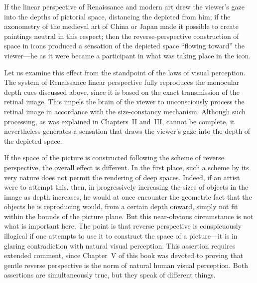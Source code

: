 If the linear perspective of Renaissance and modern art drew the viewer's gaze into
the depths of pictorial space, distancing the depicted from him; if the axonometry
of the medieval art of China or Japan made it possible to create paintings neutral
in this respect; then the reverse-perspective construction of space in icons produced
a sensation of the depicted space ``flowing toward'' the viewer---he as it were
became a participant in what was taking place in the icon.


Let us examine this effect from the standpoint of the laws of visual perception.
The system of Renaissance linear perspective fully reproduces the monocular depth
cues discussed above, since it is based on the exact transmission of the retinal
image. This impels the brain of the viewer to unconsciously process the retinal
image in accordance with the size-constancy mechanism. Although such processing,
as was explained in Chapters~II and~III, cannot be complete, it nevertheless
generates a sensation that draws the viewer's gaze into the depth of the depicted
space.

If the space of the picture is constructed following the scheme of reverse
perspective, the overall effect is different. In the first place, such a scheme by
its very nature does not permit the rendering of deep spaces. Indeed, if an artist
were to attempt this, then, in progressively increasing the sizes of objects in the
image as depth increases, he would at once encounter the geometric fact that the
objects he is reproducing would, from a certain depth onward, simply not fit within
the bounds of the picture plane. But this near-obvious circumstance is not what is
important here. The point is that reverse perspective is conspicuously illogical if
one attempts to use it to construct the space of a picture---it is in glaring
contradiction with natural visual perception. This assertion requires extended
comment, since Chapter~V of this book was devoted to proving that gentle reverse
perspective is the norm of natural human visual perception. Both assertions are
simultaneously true, but they speak of different things.

